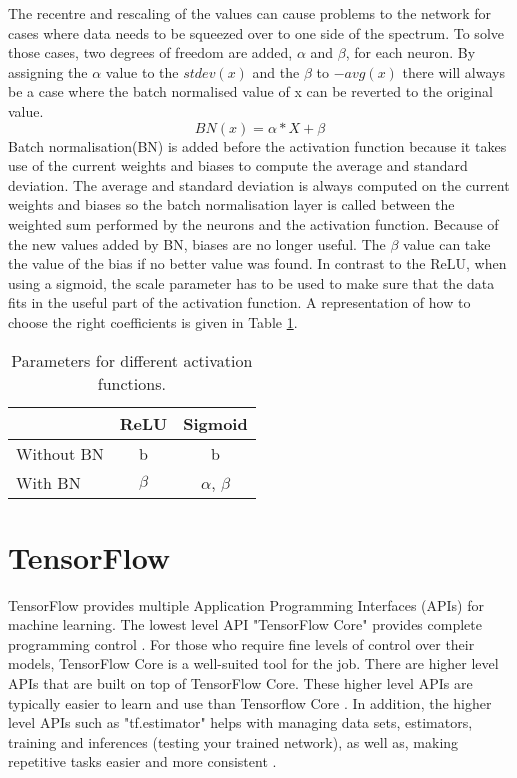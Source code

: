 The recentre and rescaling of the values can cause problems to the network for cases where data needs to be squeezed over to one side of the spectrum.
To solve those cases, two degrees of freedom are added, $\alpha$ and $\beta$, for each neuron. 
By assigning the $\alpha$ value to the $stdev(x)$ and the $\beta$ to $-avg(x)$ there will always be a case where the batch normalised value of x can be reverted to the original value.
\begin{equation}
BN(x) = \alpha * X + \beta
\end{equation}
Batch normalisation(BN) is added before the activation function because it takes use of the current weights and biases to compute the average and standard deviation. 
The average and standard deviation is always computed on the current weights and biases so the batch normalisation layer is called between the weighted sum performed by the neurons and the activation function.
Because of the new values added by BN, biases are no longer useful.
The $\beta$ value can take the value of the bias if no better value was found.
In contrast to the ReLU, when using a sigmoid, the scale parameter has to be used to make sure that the data fits in the useful part of the activation function. A representation of how to choose the right coefficients is given in Table \ref{tab:Parameters}.


\begin{table}[htbp]
\centering
\begin{tabular}{lcc}
\toprule
  & ReLU & Sigmoid \\\midrule
Without BN &b & b  \\
With BN & $\beta$ & $\alpha$, $\beta$  \\
\bottomrule
\end{tabular}
\caption{Parameters for different activation functions.}
\label{tab:Parameters}
\end{table}

\section{TensorFlow}

TensorFlow provides multiple Application Programming Interfaces
(APIs) for machine learning. 
The lowest level API "TensorFlow Core" provides complete programming control \cite{tensorflow2015-whitepaper}. 
For those who require fine levels of control over their models,
TensorFlow Core is a well-suited tool for the job. There are higher level APIs that are built on top of TensorFlow Core.
These higher level APIs are typically easier to learn and use than Tensorflow Core \cite{tensorflow2015-whitepaper}.
In addition, the higher level APIs such as "tf.estimator" helps with managing data sets, estimators,
training and inferences (testing your trained network),
as well as, making repetitive tasks easier and more consistent
\cite{tensorflow2015-whitepaper}.\\

